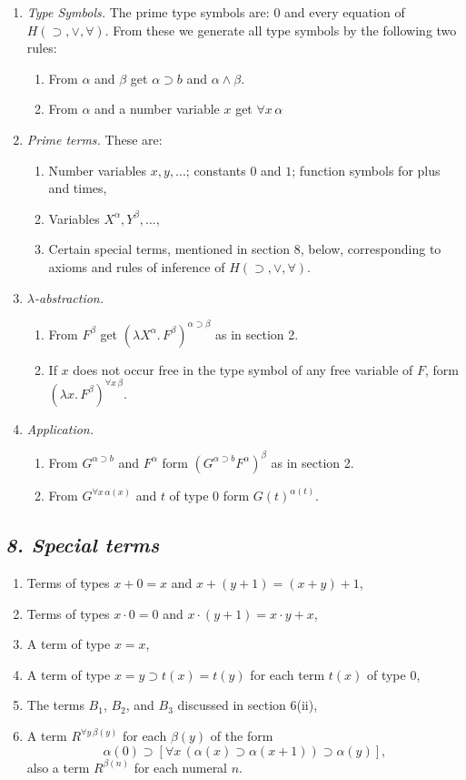 \documentclass[12pt]{article}
\def\l{\lambda}
\def\limp{\supset}
\def\a{\alpha}
\def\b{\beta}
\def\HIMP{H(\limp, \lor, \forall)}
\begin{document}
\begin{enumerate}[label=(\roman*)]

\item {\it Type Symbols.} The prime type symbols are: $0$ and every equation of $\HIMP$. From these we generate all type symbols by the following two rules:
\begin{enumerate}
\item From $\a$ and $\b$ get $\a \limp b$ and $\a \land \b$.
\item From $\a$ and a number variable $x$ get $\forall x\, \a$
\end{enumerate}
\item {\it Prime terms.} These are:
\begin{enumerate}
\item Number variables $x, y, ...$; constants $0$ and $1$; function symbols for plus and times,
\item Variables $X^\a, Y^\b, ...$,
\item Certain special terms, mentioned in section 8, below, corresponding to axioms and rules of inference of $\HIMP$.
\end{enumerate}
\item {\it $\l$-abstraction.}
\begin{enumerate}
\item From $F^\b$ get $(\l X^\a .\, F^\b )^{\a \limp \b}$ as in section 2.
\item If $x$ does not occur free in the type symbol of any free variable of $F$, form $(\l x. \, F^\b)^{\forall x \, \b}$.
\end{enumerate}

\item {\it Application.}
\begin{enumerate}
\item From $G^{\a \limp b}$ and $F^\a$ form $(G^{\a \limp b} F^\a )^\b$ as in section 2.
\item From $G^{\forall x \, \a(x)}$ and $t$ of type $0$ form $G(t)^{\a(t)}$.
\end{enumerate}

\end{enumerate}

\subsection{\it 8. Special terms}

\begin{enumerate}[label=(\roman*)]
\item Terms of types $x+0=x$ and $x+(y+1)=(x+y)+1$,
\item Terms of types $x \cdot 0=0$ and $x\cdot(y+1)=x \cdot y + x$,
\item A term of type $x = x$,
\item A term of type $x=y \limp t(x)=t(y)$ for each term $t(x)$ of type $0$,
\item The terms $B_1$, $B_2$, and $B_3$ discussed in section 6(ii),
\item A term $R^{\forall y \, \b(y)}$ for each $\b(y)$ of the form
$$
\a(0) \limp [\forall x \, (\a(x) \limp \a(x + 1)) \limp \a(y)],
$$
also a term $R^{\b(n)}$ for each numeral $n$.
\end{enumerate}
\end{document}
